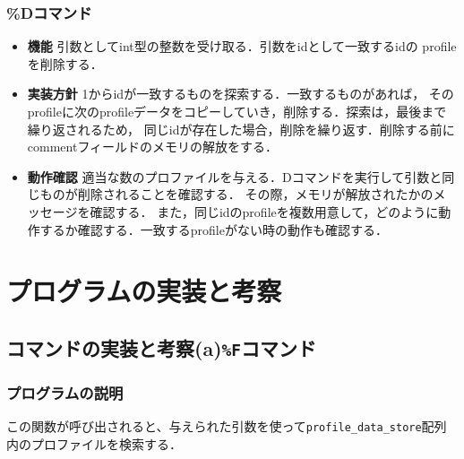 \subsubsection{\%Dコマンド}
\begin{itemize}
  \item \textbf{機能} 引数としてint型の整数を受け取る．引数をidとして一致するidの
  profileを削除する．
  \item \textbf{実装方針} 1からidが一致するものを探索する．一致するものがあれば，
  そのprofileに次のprofileデータをコピーしていき，削除する．探索は，最後まで繰り返されるため，
  同じidが存在した場合，削除を繰り返す．削除する前にcommentフィールドのメモリの解放をする．
  \item \textbf{動作確認} 適当な数のプロファイルを与える．Dコマンドを実行して引数と同じものが削除されることを確認する．
  その際，メモリが解放されたかのメッセージを確認する．
  また，同じidのprofileを複数用意して，どのように動作するか確認する．一致するprofileがない時の動作も確認する．

\end{itemize}
\clearpage
\section{プログラムの実装と考察}
  \subsection{コマンドの実装と考察(a)\texttt{\%F}コマンド}

    \subsubsection{プログラムの説明}
    
    この関数が呼び出されると、与えられた引数を使って\texttt{profile\_data\_store}配列内のプロファイルを検索する．

